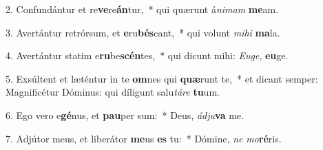 2. Confundántur et re\textbf{ve}re\textbf{án}tur,~*  qui quærunt á\textit{ni}\textit{mam} \textbf{me}am.\

3. Avertántur retrórsum, et \textbf{e}ru\textbf{bés}cant,~*  qui volunt \textit{mi}\textit{hi} \textbf{ma}la.\

4. Avertántur statim e\textbf{ru}be\textbf{scén}tes,~*  qui dicunt mihi: \textit{Eu}\textit{ge}, \textbf{eu}ge.\

5. Exsúltent et læténtur in te \textbf{om}nes qui \textbf{quæ}runt te,~*  et dicant semper: Magnificétur Dóminus: qui díligunt salu\textit{tá}\textit{re} \textbf{tu}um.\

6. Ego vero e\textbf{gé}nus, et \textbf{pau}per sum:~*  Deus, \textit{ád}\textit{ju}\textbf{va} me.\

7. Adjútor meus, et liberátor \textbf{me}us \textbf{es} tu:~*  Dómine, \textit{ne} \textit{mo}\textbf{ré}ris.\

